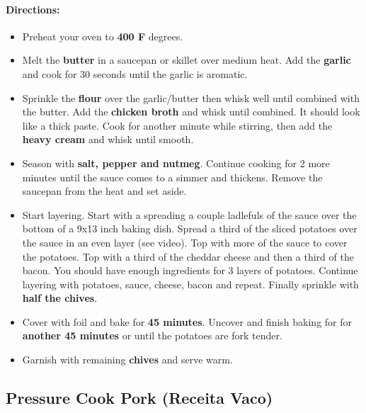 \documentclass{article}
\begin{document}
\paragraph{Directions:}
\begin{itemize}
\item Preheat your oven to \textbf{400 F} degrees.
\item Melt the \textbf{butter} in a saucepan or skillet over medium heat. Add the \textbf{garlic} and cook for 30 seconds until
the garlic is aromatic.
\item Sprinkle the \textbf{flour} over the garlic/butter then whisk well until combined with the butter. Add the \textbf{chicken broth} and whisk until combined. It should look like a thick paste. Cook for another minute while stirring, then add the \textbf{heavy cream} and whisk until smooth.
\item Season with \textbf{salt, pepper and nutmeg}. Continue cooking for 2 more minutes until the sauce comes to a simmer and thickens. Remove the saucepan from the heat and set aside.
\item Start layering. Start with a spreading a couple ladlefuls of the sauce over the bottom of a 9x13 inch baking dish. Spread a third of the sliced potatoes over the sauce in an even layer (see video). Top with
more of the sauce to cover the potatoes. Top with a third of the cheddar cheese and then a third of the bacon. You should have enough ingredients for 3 layers of potatoes. Continue layering with potatoes, sauce, cheese, bacon and repeat. Finally sprinkle with \textbf{half the chives}.
\item Cover with foil and bake for \textbf{45 minutes}. Uncover and finish baking for for \textbf{another 45 minutes} or until the potatoes are fork tender.
\item Garnish with remaining \textbf{chives} and serve warm.
\end{itemize}

\subsection{Pressure Cook Pork (Receita Vaco)}
\end{document}
